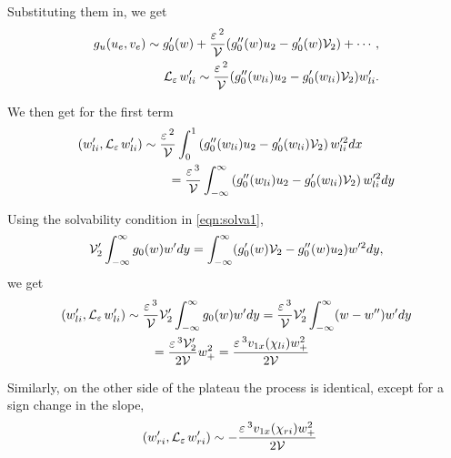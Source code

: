 Substituting them in, we get
% 
\begin{equation*}
\begin{split}
\begin{aligned}
  g_u(u_e,v_e)\sim g_0'(w)+\frac{\varepsilon\,^2}{\mathcal{V}}(g_0''(w)u_2 - g_0'(w)\mathcal{V}_2)+\cdots,\\
  \mathcal{L}_{\varepsilon\,}w_{li}' \sim \frac{\varepsilon\,^2}{\mathcal{V}}(g_0''(w_{li})u_2 - g_0'(w_{li})\mathcal{V}_2)w_{li}'.
\end{aligned}
\end{split}
\end{equation*}
%

We then get for the first term
% 
\begin{equation*}
\begin{split}
\begin{aligned}
  (w'_{li},\mathcal{L}_{\varepsilon\,}w'_{li}) &\sim \frac{\varepsilon\,^2}{\mathcal{V}}\int_0^1\left(g_0''(w_{li})u_2 - g_0'(w_{li})\mathcal{V}_2 \right)w_{li}'^2dx \\
  &\qquad= \frac{\varepsilon\,^3}{\mathcal{V}}\int_{-\infty}^{\infty}\left(g_0''(w_{li})u_2 - g_0'(w_{li})\mathcal{V}_2 \right)w_{li}'^2dy
\end{aligned}
\end{split}
\end{equation*}
% 

Using the solvability condition in \eqref{eqn:solva1}, 
% 
\begin{equation*}
\begin{split}
\begin{aligned}
  \mathcal{V}_2'\int_{-\infty}^{\infty}g_0(w)w'dy = \int_{-\infty}^{\infty}(g_0'(w)\mathcal{V}_2 - g_0''(w)u_2)w'^2dy,
\end{aligned}
\end{split}
\end{equation*}
% 
we get
% 
\begin{equation*}
\begin{split}
\begin{aligned}
  (w'_{li},\mathcal{L}_{\varepsilon\,}w'_{li}) &\sim \frac{\varepsilon\,^3}{\mathcal{V}}\mathcal{V}_2'\int_{-\infty}^{\infty}g_0(w)w'dy = \frac{\varepsilon\,^3}{\mathcal{V}}\mathcal{V}_2'\int_{-\infty}^{\infty}(w-w'')w'dy\\
  &\qquad = \frac{\varepsilon\,^3\mathcal{V}_2'}{2\mathcal{V}}w_+^2 = \frac{\varepsilon\,^3v_{1x}(\chi_{li})w_+^2}{2\mathcal{V}}
\end{aligned}
\end{split}
\end{equation*}
% 

Similarly, on the other side of the plateau the process is identical, except for a sign change in the slope,
% 
\begin{equation*}
\begin{split}
\begin{aligned}
  (w'_{ri},\mathcal{L}_{\varepsilon\,}w'_{ri}) &\sim -\frac{\varepsilon\,^3v_{1x}(\chi_{ri})w_+^2}{2\mathcal{V}}
\end{aligned}
\end{split}
\end{equation*}
% 

